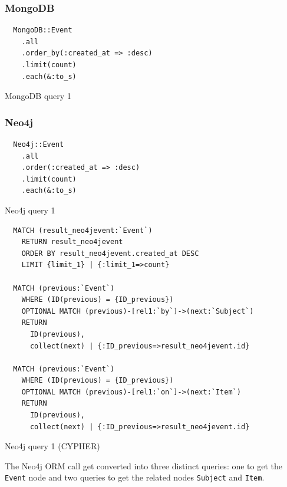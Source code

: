 \subsubsection*{MongoDB}

\begin{listing}[H]
  \begin{verbatim}
  MongoDB::Event
    .all
    .order_by(:created_at => :desc)
    .limit(count)
    .each(&:to_s)
  \end{verbatim}

  \caption{MongoDB query 1}
  \label{lst:mongodb-query-1}
\end{listing}

\subsubsection*{Neo4j}

\begin{listing}[H]
  \begin{verbatim}
  Neo4j::Event
    .all
    .order(:created_at => :desc)
    .limit(count)
    .each(&:to_s)
  \end{verbatim}

  \caption{Neo4j query 1}
  \label{lst:neo4j-query-1}
\end{listing}

\begin{listing}
  \begin{verbatim}
  MATCH (result_neo4jevent:`Event`)
    RETURN result_neo4jevent
    ORDER BY result_neo4jevent.created_at DESC
    LIMIT {limit_1} | {:limit_1=>count}

  MATCH (previous:`Event`)
    WHERE (ID(previous) = {ID_previous})
    OPTIONAL MATCH (previous)-[rel1:`by`]->(next:`Subject`)
    RETURN
      ID(previous),
      collect(next) | {:ID_previous=>result_neo4jevent.id}

  MATCH (previous:`Event`)
    WHERE (ID(previous) = {ID_previous})
    OPTIONAL MATCH (previous)-[rel1:`on`]->(next:`Item`)
    RETURN
      ID(previous),
      collect(next) | {:ID_previous=>result_neo4jevent.id}
  \end{verbatim}

  \caption{Neo4j query 1 (CYPHER)}
  \label{lst:neo4j-query-1-cypher}
\end{listing}

The Neo4j ORM call get converted into three distinct queries: one to get the \texttt{Event} node and two queries to get the related nodes \texttt{Subject} and \texttt{Item}.


